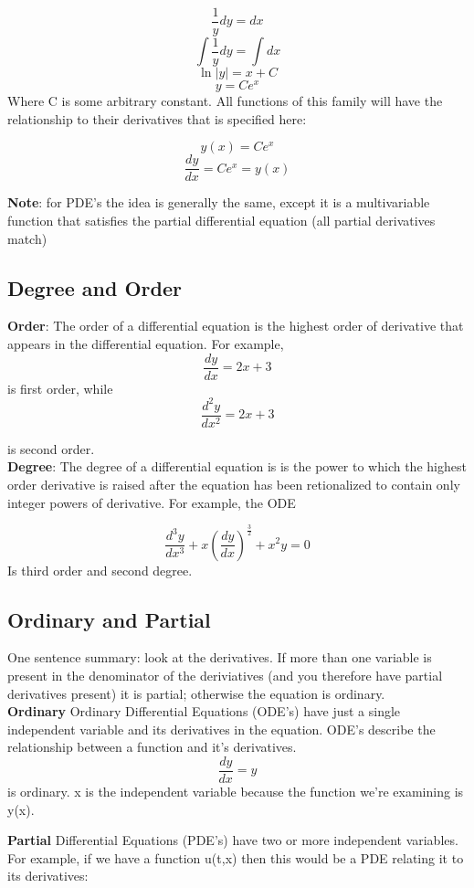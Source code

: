 \documentclass[12pt]{article}
\begin{document}
\[\frac{1}{y}dy = dx\]
\[\int \frac{1}{y}dy = \int dx\]
\[\ln |y| = x + C\]
\[y = Ce^x\]
Where C is some arbitrary constant. All functions of this family will have the relationship to their derivatives that is specified here:

\[y(x) = Ce^x\]
\[\frac{dy}{dx} = Ce^x = y(x)\]

\textbf{Note}: for PDE's the idea is generally the same, except it is a multivariable function that satisfies the partial differential equation (all partial derivatives match)

\subsection{Degree and Order}
\textbf{Order}: The order of a differential equation is the highest order of derivative that appears in the differential equation. For example,
\[\frac{dy}{dx} = 2x + 3\]
is first order, while
\[\frac{d^2y}{dx^2} = 2x + 3\]

is second order. \\

\textbf{Degree}: The degree of a differential equation is is the power to which the highest order derivative is raised after the equation has been retionalized to contain only integer powers of derivative. For example, the ODE	

\[\frac{d^3y}{dx^3} + x\left(\frac{dy}{dx}\right)^{\frac{3}{2}} + x^2y = 0\]
Is third order and second degree.\\
\subsection{Ordinary and Partial}
One sentence summary: look at the derivatives. If more than one variable is present in the denominator of the deriviatives (and you therefore have partial derivatives present) it is partial; otherwise the equation is ordinary. \\
\textbf{Ordinary} Ordinary Differential Equations (ODE's) have just a single independent variable and its derivatives in the equation. ODE's describe the relationship between a function and it's derivatives. 
\[\frac{dy}{dx} = y\] 
is ordinary. x is the independent variable because the function we're examining is y(x).

\textbf{Partial} Differential Equations (PDE's) have two or more independent variables. For example, if we have a function u(t,x) then this would be a PDE relating it to its derivatives:
\end{document}
